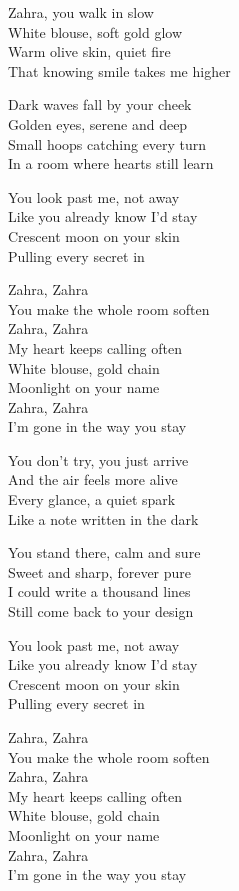 \begin{lyrics}
Zahra, you walk in slow\\
White blouse, soft gold glow\\
Warm olive skin, quiet fire\\
That knowing smile takes me higher

Dark waves fall by your cheek\\
Golden eyes, serene and deep\\
Small hoops catching every turn\\
In a room where hearts still learn

You look past me, not away\\
Like you already know I’d stay\\
Crescent moon on your skin\\
Pulling every secret in

Zahra, Zahra\\
You make the whole room soften\\
Zahra, Zahra\\
My heart keeps calling often\\
White blouse, gold chain\\
Moonlight on your name\\
Zahra, Zahra\\
I’m gone in the way you stay

You don’t try, you just arrive\\
And the air feels more alive\\
Every glance, a quiet spark\\
Like a note written in the dark

You stand there, calm and sure\\
Sweet and sharp, forever pure\\
I could write a thousand lines\\
Still come back to your design

You look past me, not away\\
Like you already know I’d stay\\
Crescent moon on your skin\\
Pulling every secret in

Zahra, Zahra\\
You make the whole room soften\\
Zahra, Zahra\\
My heart keeps calling often\\
White blouse, gold chain\\
Moonlight on your name\\
Zahra, Zahra\\
I’m gone in the way you stay


\end{lyrics}
